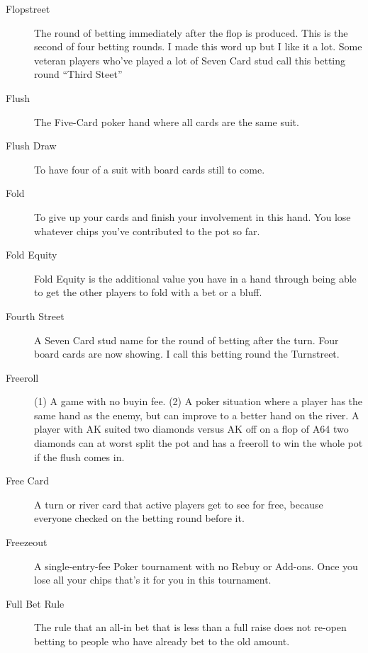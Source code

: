 \begin{description}
\item[Flopstreet] The round of betting immediately after the flop is
produced. This is the second of four betting rounds. I made this word
up but I like it a lot. Some veteran players who've played a lot of
Seven Card stud call this betting round ``Third Steet''

\item[Flush] The Five-Card poker hand where all cards are the same
suit.

\item[Flush Draw] To have four of a suit with board cards still to
come.

\item[Fold] To give up your cards and finish your involvement in this
hand. You lose whatever chips you've contributed to the pot so far.

\item[Fold Equity] Fold Equity is the additional value you have in a
hand through being able to get the other players to fold with a bet or
a bluff.

\item[Fourth Street] A Seven Card stud name for the round of betting
after the turn. Four board cards are now showing. I call this betting
round the Turnstreet.

\item[Freeroll] (1) A game with no buyin fee. (2) A poker situation
where a player has the same hand as the enemy, but can improve to a
better hand on the river. A player with AK suited two diamonds versus
AK off on a flop of A64 two diamonds can at worst split the pot and
has a freeroll to win the whole pot if the flush comes in.

\item[Free Card] A turn or river card that active players get to see
for free, because everyone checked on the betting round before it.

\item[Freezeout] A single-entry-fee Poker tournament with no Rebuy or
Add-ons. Once you lose all your chips that's it for you in this
tournament.


\item[Full Bet Rule] The rule that an all-in bet that is less than a
full raise does not re-open betting to people who have already bet to
the old amount.


\end{description}
